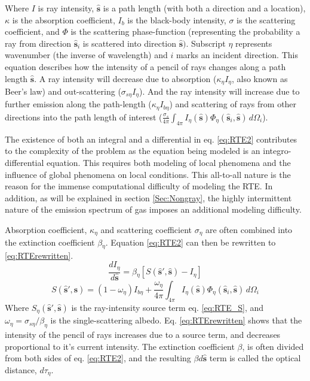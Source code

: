 Where $I$ is ray intensity, $\hat{\textbf{s}}$ is a path length (with both a direction and a location), $\kappa{}$ is the absorption coefficient, $I_b$ is the black-body intensity, $\sigma{}$ is the scattering coefficient, and $\Phi{}$ is the scattering phase-function (representing the probability a ray from direction $\hat{\textbf{s}}_i$ is scattered into direction $\hat{\textbf{s}})$. Subscript $\eta{}$ represents wavenumber (the inverse of wavelength) and $i$ marks an incident direction. 
This equation describes how the intensity of a pencil of rays changes along a path length $\hat{\textbf{s}}$. A ray intensity will decrease due to absorption ($\kappa{}_\eta{}I_\eta{}$, also known as Beer's law) and out-scattering ($\sigma{}_{s\eta{}}I_\eta{}$). And the ray intensity will increase due to further emission along the path-length ($\kappa{}_\eta{}I_{b\eta{}}$) and scattering of rays from other directions into the path length of interest ($\frac{\sigma{}_s}{4\pi}\int_{4\pi{}}{I_\eta{}(\hat{\textbf{s}})\Phi_\eta{}(\hat{\textbf{s}}_i,\hat{\textbf{s}})}\,d\Omega{}_i$). 

The existence of both an integral and a differential in eq. \ref{eq:RTE2} contributes to the complexity of the problem as the equation being modeled is an integro-differential equation. 
This requires both modeling of local phenomena and the influence of global phenomena on local conditions. 
This all-to-all nature is the reason for the immense computational difficulty of modeling the RTE. 
In addition, as will be explained in section \ref{Sec:Nongray}, the highly intermittent nature of the emission spectrum of gas imposes an additional modeling difficulty.

Absorption coefficient, $\kappa_{\eta{}}$ and scattering coefficient $\sigma{}_\eta{}$ are often combined into the extinction coefficient $\beta{}_\eta{}$. Equation \ref{eq:RTE2} can then be rewritten to \ref{eq:RTErewritten}.
\begin{equation}
    \frac{dI_\eta{}}{d\hat{\textbf{s}}} = \beta{}_\eta{}[S(\hat{\textbf{s}}',\hat{\textbf{s}})-I_\eta{}]
    \label{eq:RTErewritten}
\end{equation}
\begin{equation}
    S(\hat{\textbf{s}}',\hat{\textbf{s}}) = (1-\omega{}_\eta{})I_{b\eta{}}+\frac{\omega{}_\eta{}}{4\pi}\int_{4\pi{}}{I_\eta{}(\hat{\textbf{s}})\Phi_\eta{}(\hat{\textbf{s}}_i,\hat{\textbf{s}})}\,d\Omega{}_i
    \label{eq:RTE_S}
\end{equation}
Where $S_\eta{}(\hat{\textbf{s}}',\hat{\textbf{s}})$ is the ray-intensity source term eq. \ref{eq:RTE_S}, and $\omega{}_\eta{}=\sigma{}_{s\eta{}}/\beta_{\eta{}}$ is the single-scattering albedo. Eq. \ref{eq:RTErewritten} shows that the intensity of the pencil of rays increases due to a source term, and decreases proportional to it's current intensity.
The extinction coefficient $\beta{}$, is often divided from both sides of eq. \ref{eq:RTE2}, and the resulting $\beta{}d\hat{\textbf{s}}$ term is called the optical distance, $d\tau{}_\eta{}$.

